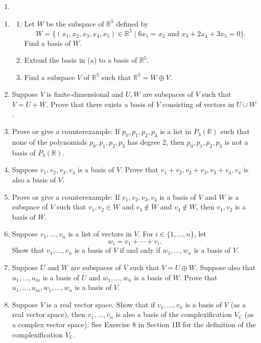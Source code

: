 \documentclass[
]{book}
\providecommand{\tightlist}{%
  \setlength{\itemsep}{0pt}\setlength{\parskip}{0pt}}
\theoremstyle{definition}
\theoremstyle{definition}
\theoremstyle{definition}
\theoremstyle{definition}
\theoremstyle{remark}
\begin{document}
\begin{enumerate}
\def\labelenumi{\alph{enumi}.}
\setcounter{enumi}{2}
\tightlist
\item
\end{enumerate}

\begin{enumerate}
\def\labelenumi{\arabic{enumi}.}
\setcounter{enumi}{3}
\item
  \begin{enumerate}
  \def\labelenumii{(\alph{enumii})}
  \item
    Let \(W\) be the subspace of \(\mathbb{R}^5\) defined by
    \[W = \{(x_1, x_2, x_3, x_4, x_5) \in \mathbb{R}^5 \mid 6x_1 = x_2 \text{ and } x_3 + 2x_4 + 3x_5 = 0\}.\]
    Find a basis of \(W\).
  \item
    Extend the basis in (a) to a basis of \(\mathbb{R}^5\).
  \item
    Find a subspace \(V\) of \(\mathbb{R}^5\) such that \(\mathbb{R}^5 = W \oplus V\).
  \end{enumerate}
\item
  Suppose \(V\) is finite-dimensional and \(U, W\) are subspaces of \(V\) such that \(V = U + W\). Prove that there exists a basis of \(V\) consisting of vectors in \(U \cup W\).
\item
  Prove or give a counterexample: If \(p_0, p_1, p_2, p_3\) is a list in \(P_3(\mathbb{R})\) such that none of the polynomials \(p_0, p_1, p_2, p_3\) has degree 2, then \(p_0, p_1, p_2, p_3\) is not a basis of \(P_3(\mathbb{R})\).
\item
  Suppose \(v_1, v_2, v_3, v_4\) is a basis of \(V\). Prove that \(v_1 + v_2, v_2 + v_3, v_3 + v_4, v_4\) is also a basis of \(V\).
\item
  Prove or give a counterexample: If \(v_1, v_2, v_3, v_4\) is a basis of \(V\) and \(W\) is a subspace of \(V\) such that \(v_1, v_2 \in W\) and \(v_3 \notin W\) and \(v_4 \notin W\), then \(v_1, v_2\) is a basis of \(W\).
\item
  Suppose \(v_1, \ldots, v_n\) is a list of vectors in \(V\). For \(i \in \{1, \ldots, n\}\), let
  \[w_i = v_1 + \cdots + v_i.\]
  Show that \(v_1, \ldots, v_n\) is a basis of \(V\) if and only if \(w_1, \ldots, w_n\) is a basis of \(V\).
\item
  Suppose \(U\) and \(W\) are subspaces of \(V\) such that \(V = U \oplus W\). Suppose also that \(u_1, \ldots, u_m\) is a basis of \(U\) and \(w_1, \ldots, w_n\) is a basis of \(W\). Prove that \(u_1, \ldots, u_m, w_1, \ldots, w_n\) is a basis of \(V\).
\item
  Suppose \(V\) is a real vector space. Show that if \(v_1, \ldots, v_n\) is a basis of \(V\) (as a real vector space), then \(v_1, \ldots, v_n\) is also a basis of the complexification \(V_{\mathbb{C}}\) (as a complex vector space).
  See Exercise 8 in Section 1B for the definition of the complexification \(V_{\mathbb{C}}\).
\end{enumerate}

  
\end{document}
